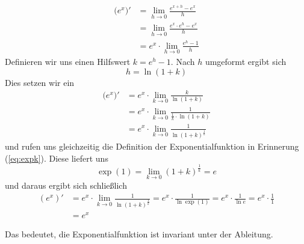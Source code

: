 \begin{equation}
\begin{split}
\big(e^x\big)' &= \lim_{h\rightarrow 0} \frac{e^{x+h}-e^x}{h} \\
&= \lim_{h\rightarrow 0} \frac{e^{x}\cdot e^{h}-e^x}{h} \\
&= e^x \cdot \lim_{h\rightarrow 0} \frac{e^{h}-1}{h}
\end{split}
\end{equation}
Definieren wir uns einen Hilfswert $k = e^h-1$. Nach $h$ umgeformt ergibt sich
\begin{equation}
h = \ln (1+k)
\end{equation}
Dies setzen wir ein
\begin{equation}
\begin{split}
\big(e^x\big)' &= e^x\cdot \lim_{k\rightarrow 0} \frac{k}{\ln (1+k)}\\
&= e^x\cdot \lim_{k\rightarrow 0} \frac{1}{\frac{1}{k}\cdot \ln (1+k)} \\
&= e^x\cdot \lim_{k\rightarrow 0} \frac{1}{\ln (1+k)^{\frac{1}{k}} }
\end{split}
\end{equation}
und rufen uns gleichzeitig die Definition der Exponentialfunktion in Erinnerung (\ref{eq:expk}). Diese liefert uns
\begin{equation}
\exp(1) = \lim_{k\rightarrow 0} (1+k)^{\frac{1}{k}} = e
\end{equation}
und daraus ergibt sich schließlich
\begin{equation}
\begin{split}
(e^x)' &= e^x\cdot \lim_{k\rightarrow 0} \frac{1}{\ln (1+k)^{\frac{1}{k}} }= e^x\cdot \frac{1}{\ln \exp(1) } = e^x\cdot \frac{1}{\ln e } = e^x\cdot \frac{1}{1}\\
&= e^x
\end{split}
\end{equation}

Das bedeutet, die Exponentialfunktion ist invariant unter der Ableitung. 


